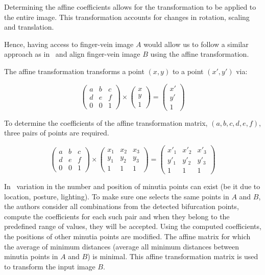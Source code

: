 Determining the affine coefficients allows for the transformation to be applied to the entire image.
This transformation accounts for changes in rotation, scaling and translation.

Hence, having access to finger-vein image $A$ would allow us to follow a similar approach as in~\cite{minutia} and align finger-vein image $B$ using the affine transformation. 

The affine transformation transforms a point $(x,y)$ to a point $(x',y')$ via:

$$\begin{pmatrix}
a & b & c\\
d & e & f\\
0 & 0 & 1
\end{pmatrix} \times \begin{pmatrix}
x\\
y\\
1
\end{pmatrix}  = \begin{pmatrix}
x'\\
y'\\
1
\end{pmatrix} $$

To determine the coefficients of the affine transformation matrix, $(a,b,c,d,e,f)$, three pairs of points are required. 

$$\begin{pmatrix}
a & b & c\\
d & e & f\\
0 & 0 & 1
\end{pmatrix} \times \begin{pmatrix}
x_1 & x_2 & x_3\\
y_1 & y_2 & y_3\\
1 & 1 & 1
\end{pmatrix}  = \begin{pmatrix}
x'_1 & x'_2 & x'_3\\
y'_1 & y'_2 & y'_3\\
1 & 1 & 1
\end{pmatrix} $$

In~\cite{minutia} variation in the number and position of minutia points can exist (be it due to location, posture, lighting). To make sure one selects the same points in $A$ and $B$, the authors consider all combinations from the detected bifurcation points, compute the coefficients for each such pair and when they belong to the predefined range of values, they will be accepted. Using the computed coefficients, the positions of other minutia points are modified.
The affine matrix for which the average of minimum distances (average all minimum distances between minutia points in $A$ and $B$) is minimal. This affine transformation matrix is used to transform the input image $B$.


